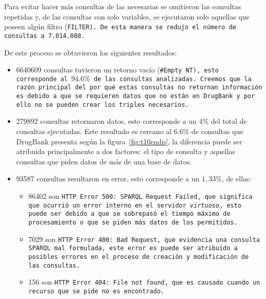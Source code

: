 Para evitar hacer más consultas de las necesarias se omitieron las consultas
repetidas y, de las consultas con solo variables, se ejecutaron solo aquellas
que poseen algún filtro (\tt{FILTER}). De esta manera se redujo el número de
consultas a 7.014.088.

De este proceso se obtuvieron los siguientes resultados:
\begin{itemize}
  \item
    6640609 consultas tuvieron un retorno vacío (\tt{\#Empty NT}), esto
    corresponde al $94.6\%$ de las consultas analizadas.
    Creemos que la razón principal del por qué estas consultas no retornan
    información es debido a que se requieren datos que no están en DrugBank y
    por ello no se pueden crear los triples necesarios.
  \item
    279892 consultas retornaron datos, esto corresponde a un $4\%$ del total de
    consultas ejecutadas. Este resultado es cercano al $6.6\%$ de consultas que
    DrugBank presenta según la figura~\ref{fig:t10endp}, la diferencia puede ser
    atribuida principalmente a dos factores: el tipo de consulta y aquellas
    consultas que piden datos de más de una base de datos.
  \item
    93587 consultas resultaron en error, esto corresponde a un $1,33\%$, de
    ellas:
    \begin{itemize}
      \item
        86402 son \tt{HTTP Error 500: SPARQL Request Failed}, que significa que
        ocurrió un error interno en el servidor \emph{virtuoso}, esto puede ser
        debido a que se sobrepasó el tiempo máximo de procesamiento o que se
        piden más datos de los permitidos.
      \item 
        7029 son \tt{HTTP Error 400: Bad Request}, que evidencia una consulta
        SPARQL mal formulada, este error es puede ser atribuido a posibles
        errores en el proceso de creación y modificación de las consultas.
      \item
        156 son \tt{HTTP Error 404: File not found}, que es causado cuando un
        recurso que se pide no es encontrado.
    \end{itemize}
\end{itemize}

